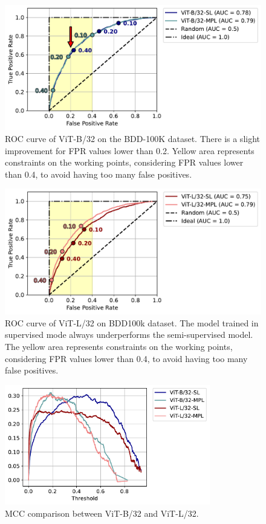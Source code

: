 \begin{figure}
\centering
\includegraphics[width=\textwidth]{images/bdd100k/training/ViT-B32/roc-auc.pdf}
\caption[ROC curve of ViT-B/32 on the BDD-100K dataset]
{ROC curve of ViT-B/32 on the BDD-100K dataset. There is a slight improvement 
for FPR values lower than 0.2. Yellow area represents constraints on the working 
points, considering FPR values lower than 0.4, to avoid having too many false 
positives.}
\end{figure}

\begin{figure}
    \centering
    \includegraphics[width=\textwidth]{images/bdd100k/training/ViT-L32/roc-auc.pdf}
    \caption[ROC curve of ViT-L/32 on the BDD-100K dataset.]
    {ROC curve of ViT-L/32 on BDD100k dataset. The model trained in supervised 
    mode always underperforms the semi-supervised model.
    The yellow area represents constraints on the working points, considering 
    FPR values lower than 0.4, to avoid having too many false positives.}
\end{figure}

\begin{figure}
    \centering
    \includegraphics[width=0.8\textwidth]{images/bdd100k/training/mcc_comp.pdf}
    \caption{MCC comparison between ViT-B/32 and ViT-L/32.}
\end{figure}


